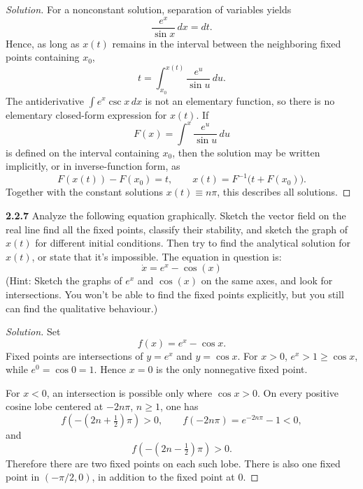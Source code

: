 \documentclass[10pt]{amsart}
\newenvironment{solution}
{\begin{proof}[Solution]}
{\end{proof}}
\begin{document}
\begin{onehalfspace}
\begin{solution}
            For a nonconstant solution, separation of variables yields
            \[
                \frac{e^x}{\sin x}\,dx=dt.
            \]
            Hence, as long as $x(t)$ remains in the interval between the neighboring
            fixed points containing $x_0$,
            \[
                \boxed{
                    t=\int_{x_0}^{x(t)}\frac{e^u}{\sin u}\,du.
                }
            \]
            The antiderivative $\int e^x\csc x\,dx$ is not an elementary function, so
            there is no elementary closed-form expression for $x(t)$. If
            \[
                F(x)=\int^x\frac{e^u}{\sin u}\,du
            \]
            is defined on the interval containing $x_0$, then the solution may be
            written implicitly, or in inverse-function form, as
            \[
                F(x(t))-F(x_0)=t,
                \qquad
                \boxed{x(t)=F^{-1}\bigl(t+F(x_0)\bigr).}
            \]
            Together with the constant solutions $x(t)\equiv n\pi$, this describes all
            solutions.
        \end{solution}

        \noindent\textbf{2.2.7} Analyze the following equation graphically.
        Sketch the vector field on the real line find all the fixed points, classify their
        stability, and sketch the graph of $x(t)$ for different initial conditions.
        Then try to find the analytical solution for $x(t)$, or state that it's impossible.
        The equation in question is:
        \[
            \dot{x} = e^{x}-\cos(x)
        \]
        (Hint: Sketch the graphs of $e^x$ and $\cos(x)$ on the same axes, and look for
        intersections. You won't be able to find the fixed points explicitly, but you still can
        find the qualitative behaviour.)

        \begin{solution}
            Set
            \[
                f(x)=e^x-\cos x.
            \]
            Fixed points are intersections of $y=e^x$ and $y=\cos x$. For $x>0$,
            $e^x>1\geq \cos x$, while $e^0=\cos0=1$. Hence $x=0$ is the only
            nonnegative fixed point.

            For $x<0$, an intersection is possible only where $\cos x>0$. On every
            positive cosine lobe centered at $-2n\pi$, $n\geq1$, one has
            \[
                f\left(-\left(2n+\tfrac12\right)\pi\right)>0,
                \qquad f(-2n\pi)=e^{-2n\pi}-1<0,
            \]
            and
            \[
                f\left(-\left(2n-\tfrac12\right)\pi\right)>0.
            \]
            Therefore there are two fixed points on each such lobe. There is also one
            fixed point in $(-\pi/2,0)$, in addition to the fixed point at $0$.


\end{solution}
\end{onehalfspace}
\end{document}
